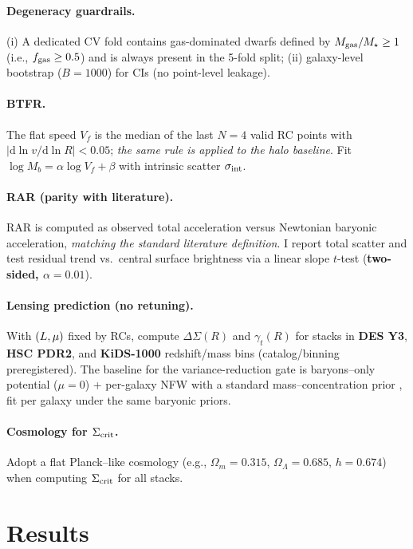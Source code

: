 		\paragraph{Degeneracy guardrails.}
		(i) A dedicated CV fold contains gas-dominated dwarfs defined by $M_{\rm gas}/M_\star\ge 1$ (i.e., $f_{\rm gas} \ge 0.5$) and is always present in the 5-fold split; (ii) galaxy-level bootstrap ($B=1000$) for CIs (no point-level leakage).
		
		\paragraph{BTFR.}
		The flat speed $V_f$ is the median of the last $N=4$ valid RC points with $\left|\mathrm{d}\ln v/\mathrm{d}\ln R\right|<0.05$; \emph{the same rule is applied to the halo baseline}. Fit $\log M_b=\alpha\log V_f+\beta$ with intrinsic scatter $\sigma_{\rm int}$.
		
		\paragraph{RAR (parity with literature).}
		RAR is computed as observed total acceleration versus Newtonian baryonic acceleration, \emph{matching the standard literature definition}. I report total scatter and test residual trend vs.\ central surface brightness via a linear slope $t$-test (\textbf{two-sided, $\alpha=0.01$}).
		
		\paragraph{Lensing prediction (no retuning).}
		With $(L,\mu)$ fixed by RCs, compute $\Delta\Sigma(R)$ and $\gamma_t(R)$ for stacks in \textbf{DES Y3}, \textbf{HSC PDR2}, and \textbf{KiDS-1000} redshift/mass bins (catalog/binning preregistered). The baseline for the variance-reduction gate is baryons--only potential ($\mu=0$) + per-galaxy NFW with a standard mass–concentration prior \citep{dutton2014mcr}, fit per galaxy under the same baryonic priors.
		
\paragraph{Cosmology for $\Sigma_{\rm crit}$.}
Adopt a flat Planck–like cosmology \citep{planck2018vi} (e.g., $\Omega_m=0.315$, $\Omega_\Lambda=0.685$, $h=0.674$) when computing $\Sigma_{\rm crit}$ for all stacks.

		\section{Results}\label{sec:results}
